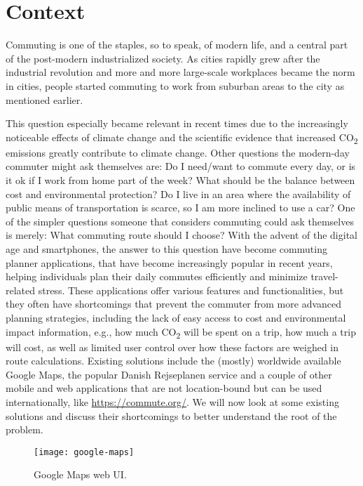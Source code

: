 \section{Context}\label{sec:context}

Commuting is one of the staples, so to speak, of modern life, and a central part of the post-modern industrialized
society.
As cities rapidly grew after the industrial revolution and more and more large-scale workplaces became the norm in
cities, people started commuting to work from suburban areas to the city as mentioned earlier.

This question especially became relevant in recent times due to the increasingly noticeable effects of climate change
and the scientific evidence that increased \unit{CO_{2}} emissions greatly contribute to climate change.
Other questions the modern-day commuter might ask themselves are: Do I need/want to commute every day, or is it ok if I
work from home part of the week?
What should be the balance between cost and environmental protection?
Do I live in an area where the availability of public means of transportation is scarce, so I am more inclined to use a
car?
One of the simpler questions someone that considers commuting could ask themselves is merely: What commuting route
should I choose?
With the advent of the digital age and smartphones, the answer to this question have become commuting planner
applications, that have become increasingly popular in recent years, helping individuals plan their daily commutes
efficiently and minimize travel-related stress.
These applications offer various features and functionalities, but they often have shortcomings that prevent the
commuter from more advanced planning strategies, including the lack of easy access to cost and environmental impact
information, e.g., how much \unit{CO_{2}} will be spent on a trip, how much a trip will cost, as well as limited user
control over how these factors are weighed in route calculations.
Existing solutions include the (mostly) worldwide available Google Maps, the popular Danish Rejseplanen service and a
couple of other mobile and web applications that are not location-bound but can be used internationally, like
\url{https://commute.org/}.
We will now look at some existing solutions and discuss their shortcomings to better understand the root of the problem.

\begin{figure}
    \centering
    \texttt{[image: google-maps]}
    \caption{Google Maps web UI.}
    \label{fig:figure6}
\end{figure}

